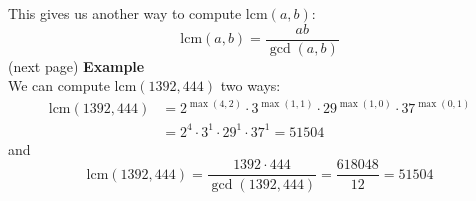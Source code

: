 \documentclass{report}
\theoremstyle{definition}
\begin{document}
This gives us another way to compute $\text{lcm}(a,b)$:
\begin{equation*}
\text{lcm}(a,b)=\frac{ab}{\gcd(a,b)}
\end{equation*}
(next page)\newpage
\noindent\textbf{Example}\\
We can compute $\text{lcm}(1392,444)$ two ways:
\begin{align*}
\text{lcm}(1392,444)&=2^{\max(4,2)}\cdot3^{\max(1,1)}\cdot29^{\max(1,0)}\cdot37^{\max(0,1)}\\
&=2^4\cdot3^1\cdot29^1\cdot37^1=51504
\end{align*}
and
\begin{equation*}
\text{lcm}(1392,444)=\frac{1392\cdot444}{\gcd(1392,444)}=\frac{618048}{12}=51504
\end{equation*}
\newpage
\end{document}
